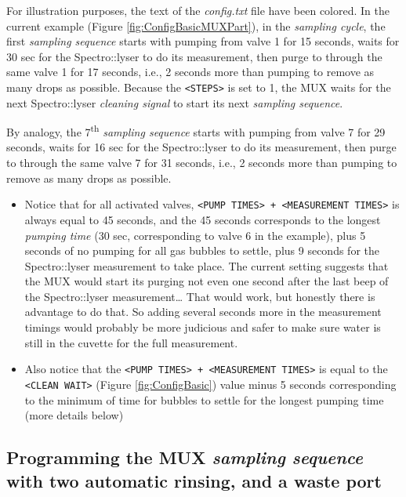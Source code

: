 \documentclass[]{book}
\begin{document}
For illustration purposes, the text of the \emph{config.txt} file have been colored. In the current example (Figure \ref{fig:ConfigBasicMUXPart}), in the \emph{sampling cycle}, the first \emph{sampling sequence} starts with pumping from valve 1 for 15 seconds, waits for 30 sec for the Spectro::lyser to do its measurement, then purge to through the same valve 1 for 17 seconds, i.e., 2 seconds more than pumping to remove as many drops as possible. Because the \texttt{\textless{}STEPS\textgreater{}} is set to 1, the MUX waits for the next Spectro::lyser \emph{cleaning signal} to start its next \emph{sampling sequence}.

By analogy, the 7\textsuperscript{th} \emph{sampling sequence} starts with pumping from valve 7 for 29 seconds, waits for 16 sec for the Spectro::lyser to do its measurement, then purge to through the same valve 7 for 31 seconds, i.e., 2 seconds more than pumping to remove as many drops as possible.

\begin{itemize}
\item
  Notice that for all activated valves, \texttt{\textless{}PUMP\ TIMES\textgreater{}\ +\ \textless{}MEASUREMENT\ TIMES\textgreater{}} is always equal to 45 seconds, and the 45 seconds corresponds to the longest \emph{pumping time} (30 sec, corresponding to valve 6 in the example), plus 5 seconds of no pumping for all gas bubbles to settle, plus 9 seconds for the Spectro::lyser measurement to take place. The current setting suggests that the MUX would start its purging not even one second after the last beep of the Spectro::lyser measurement\ldots{} That would work, but honestly there is advantage to do that. So adding several seconds more in the measurement timings would probably be more judicious and safer to make sure water is still in the cuvette for the full measurement.
\item
  Also notice that the \texttt{\textless{}PUMP\ TIMES\textgreater{}\ +\ \textless{}MEASUREMENT\ TIMES\textgreater{}} is equal to the \texttt{\textless{}CLEAN\ WAIT\textgreater{}} (Figure \ref{fig:ConfigBasic}) value minus 5 seconds corresponding to the minimum of time for bubbles to settle for the longest pumping time (more details below)
\end{itemize}

\hypertarget{programming-the-mux-sampling-sequence-with-two-automatic-rinsing-and-a-waste-port}{%
\subsection{\texorpdfstring{Programming the MUX \emph{sampling sequence} with two automatic rinsing, and a waste port}{Programming the MUX sampling sequence with two automatic rinsing, and a waste port}}\label{programming-the-mux-sampling-sequence-with-two-automatic-rinsing-and-a-waste-port}}
\end{document}
